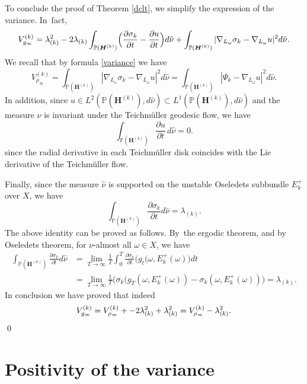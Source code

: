 \documentclass[10pt]{amsart}
\theoremstyle{plain}
\theoremstyle{definition}
\numberwithin{equation}{subsection}
\newcommand\bP{\mathbb{P}}
\let\gradient\nabla
\newcommand{\bfH}{\boldsymbol{H}}
\begin{document}
To conclude the proof of Theorem \ref{dclt}, we simplify the
expression of the variance. In~fact,
\[
V^{(k)}_{g_\infty}= \lambda_{(k)}^2 -2 \lambda_{(k)}\int_{\bP(\bfH^{(k)})} \Bigl(\frac{\partial\sigma_k}{\partial t}-\frac{\partial u}{\partial t} \Bigr) d \hat \nu + \int_{\bP(\bfH^{(k)})} | \gradient_{L_\omega}\sigma_k - \gradient_{L_\omega}u|^2 d \hat \nu.
\]
We recall that by formula \eqref{variance} we have
\[
V^{(k)}_{\rho_\infty}=\int_{\bP(\bfH^{(k)})} | \gradient_{L_\omega}\sigma_k - \gradient_{L_\omega}u|^2 d \hat \nu =\int_{\bP(\bfH^{(k)})} |\Psi_k -\gradient_{L_\omega}u|^2 d\hat{\nu}.
\]
In addition, since $u \in L^2(\bP(\bfH^{(k)}), d\hat\nu)
\subset L^1(\bP(\bfH^{(k)}), d\hat\nu)$ and the measure
$\hat \nu$ is invariant under the Teichmüller geodesic flow, we have
\[
\int_{\bP(\bfH^{(k)})} \frac{\partial u}{\partial t} \, d \hat \nu =0.
\]
since the radial derivative in each Teichmüller disk coincides with
the Lie derivative of the Teichmüller flow.

Finally, since the measure $\hat \nu$ is supported on the unstable Oseledets subbundle $E^+_k$ over $X$, we have
\[
\int_{\bP(\bfH^{(k)})} \frac{\partial\sigma_k}{\partial t} d \hat \nu =\lambda_{(k)}.
\]
The above identity can be proved as follows. By~the ergodic theorem, and by Oseledets theorem, for $\nu$-almost all $\omega \in X$, we have
\[
\begin{aligned}
\int_{\bP(\bfH^{(k)})} \frac{\partial\sigma_k}{\partial t} d \hat \nu &= \lim_{T\to \infty}\frac{1}{T} \int_0^T \frac{\partial\sigma_k}{\partial t} \bigl(g_t(\omega, E^+_k(\omega)\bigr) dt \\ & = \lim_{T\to \infty} \frac{1}{T} \Big(\sigma_k(g_T(\omega, E^+_k(\omega)) -
\sigma_k(\omega, E^+_k(\omega)) \Big) = \lambda_{(k)}.
\end{aligned}
\]
In conclusion we have proved that indeed
\begin{equation}\label{dvarianceformula}
V^{(k)}_{g_\infty}= V^{(k)}_{\rho_\infty} + - 2\lambda_{(k)}^2 + \lambda_{(k)}^2 = V^{(k)}_{\rho_\infty}- \lambda_{(k)}^2.
\vspace*{-1.3\baselineskip}
\end{equation}
\qed
\vspace*{\baselineskip}

\section{Positivity of the variance}\label{posvar}
\end{document}
